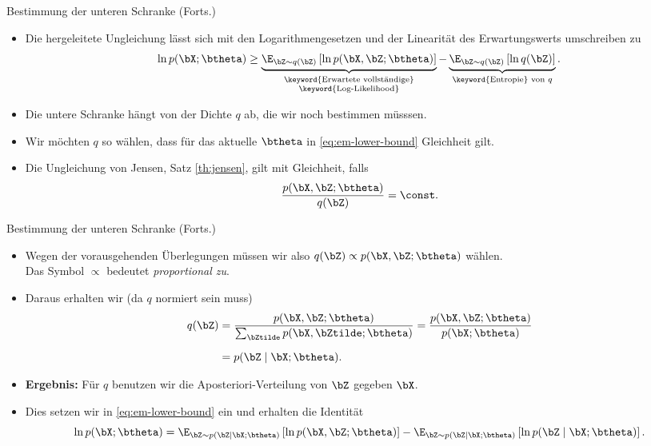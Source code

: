 \begin{frame}{Bestimmung der unteren Schranke (Forts.)}{}
	\begin{itemize}
		\item Die hergeleitete Ungleichung lässt sich mit den Logarithmengesetzen und der Linearität des Erwartungswerts umschreiben zu
		\begin{equation} \label{eq:em-lower-bound}
			\ln p(\bX; \btheta) \ge \underbrace{
				\E_{\bZ \sim q(\bZ)}\left[ \ln p(\bX, \bZ; \btheta) \right]
			}_{\substack{\text{\keyword{Erwartete vollständige}} \\ \text{\keyword{Log-Likelihood}}}} - 
			\underbrace{
				\E_{\bZ \sim q(\bZ)}\left[ \ln q(\bZ) \right]
			}_{\text{\keyword{Entropie} von $q$}}.
		\end{equation}
		\item Die untere Schranke hängt von der Dichte $q$ ab, die wir noch bestimmen müsssen.
		\item Wir möchten $q$ so wählen, dass für das aktuelle $\btheta$ in \eqref{eq:em-lower-bound} Gleichheit gilt.
		\item Die Ungleichung von Jensen, Satz \eqref{th:jensen}, gilt mit Gleichheit, falls
		\begin{equation*}
			\frac{p(\bX, \bZ; \btheta)}{q(\bZ)} = \const.
		\end{equation*}
	\end{itemize}
\end{frame}


\begin{frame}{Bestimmung der unteren Schranke (Forts.)}{}
	\begin{itemize}
		\item Wegen der vorausgehenden Überlegungen müssen wir also $q(\bZ) \propto p(\bX, \bZ; \btheta)$ wählen. \\
			Das Symbol $\propto$ bedeutet \textit{proportional zu}.
		\item Daraus erhalten wir (da $q$ normiert sein muss)
		\begin{align*}
			q(\bZ)
				&= \frac{p(\bX, \bZ; \btheta)}{\sum_{\bZtilde} p(\bX, \bZtilde; \btheta)}
					= \frac{p(\bX, \bZ; \btheta)}{p(\bX; \btheta)}
		\\[2mm]
				&= p(\bZ \mid \bX; \btheta).
		\end{align*}
		\item \textbf{Ergebnis:} Für $q$ benutzen wir die Aposteriori-Verteilung von $\bZ$ gegeben $\bX$.
		\item Dies setzen wir in \eqref{eq:em-lower-bound} ein und erhalten die Identität
		\begin{equation*}
			\ln p(\bX; \btheta) = \E_{\bZ \sim p(\bZ \mid \bX; \btheta)}\left[ \ln p(\bX, \bZ; \btheta) \right]
				- \E_{\bZ \sim p(\bZ \mid \bX; \btheta)}\left[ \ln p(\bZ \mid \bX; \btheta) \right].
		\end{equation*}
	\end{itemize}
\end{frame}


